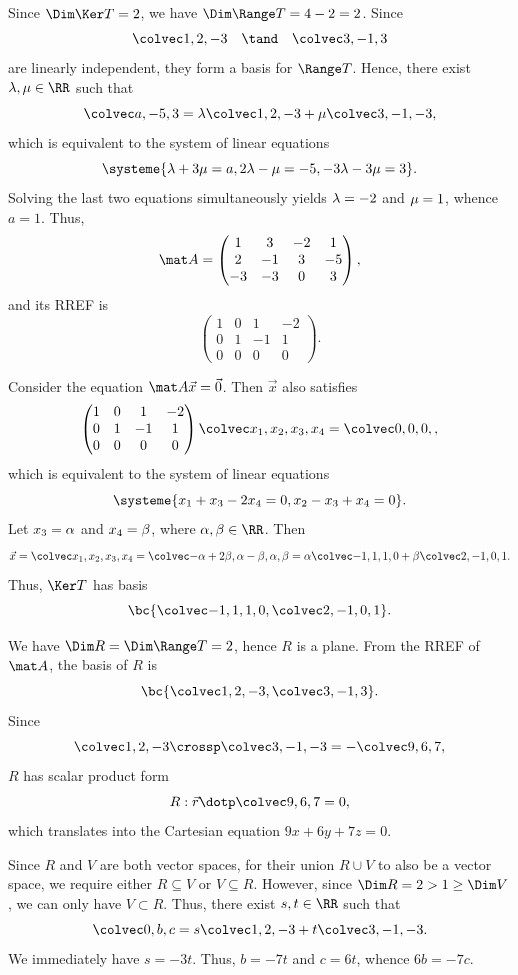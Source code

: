 \begin{solution}
    \begin{ppart}
        Since $\Dim \Ker T = 2$, we have $\Dim \Range T = 4 - 2 = 2$. Since \[\cveciii12{-3} \quad \tand \quad \cveciii3{-1}{3}\] are linearly independent, they form a basis for $\Range T$. Hence, there exist $\l, \m \in \RR$ such that \[\cveciii{a}{-5}{3} = \l \cveciii12{-3} + \m \cveciii3{-1}{-3},\] which is equivalent to the system of linear equations \[\systeme{\l + 3\m = a, 2\l - \m = -5, -3\l - 3\m = 3}.\] Solving the last two equations simultaneously yields $\lambda = -2$ and $\mu = 1$, whence $a = 1$. Thus, \[\mat A = \begin{pmatrix}1 & 3 & -2 & 1 \\ 2 & -1 & 3 & -5 \\ -3 & -3 & 0 & 3\end{pmatrix},\] and its RREF is \[\begin{pmatrix}1 & 0 & 1 & -2 \\ 0 & 1 & -1 & 1 \\ 0 & 0 & 0 & 0\end{pmatrix}.\]

        Consider the equation $\mat A \vec x = \vec 0$. Then $\vec x$ also satisfies \[\begin{pmatrix}1 & 0 & 1 & -2 \\ 0 & 1 & -1 & 1 \\ 0 & 0 & 0 & 0\end{pmatrix} \cveciv{x_1}{x_2}{x_3}{x_4} = \cveciv000,\] which is equivalent to the system of linear equations \[\systeme{x_1 + x_3 - 2x_4 = 0, x_2 - x_3 + x_4 = 0}.\] Let $x_3 = \alpha$ and $x_4 = \beta$, where $\a, \b \in \RR$. Then \[\vec x = \cveciv{x_1}{x_2}{x_3}{x_4} = \cveciv{-\a + 2\b}{\a - \b}{\a}{\b} = \a \cveciv{-1}110 + \b \cveciv2{-1}01.\] Thus, $\Ker T$ has basis \[\bc{\cveciv{-1}110, \cveciv2{-1}01}.\]
    \end{ppart}
    \begin{ppart}
        We have $\Dim R = \Dim \Range T = 2$, hence $R$ is a plane. From the RREF of $\mat A$, the basis of $R$ is \[\bc{\cveciii12{-3}, \cveciii3{-1}3}.\] Since \[\cveciii12{-3} \crossp \cveciii3{-1}{-3} = -\cveciii967,\] $R$ has scalar product form \[R : \vec r \dotp \cveciii967 = 0,\] which translates into the Cartesian equation $9x + 6y + 7z = 0$.
    \end{ppart}
    \begin{ppart}
        Since $R$ and $V$ are both vector spaces, for their union $R \cup V$ to also be a vector space, we require either $R \subseteq V$ or $V \subseteq R$. However, since $\Dim R = 2 > 1 \geq \Dim V$, we can only have $V \subset R$. Thus, there exist $s, t \in \RR$ such that \[\cveciii0bc = s \cveciii12{-3} + t\cveciii3{-1}{-3}.\] We immediately have $s = -3t$. Thus, $b = -7t$ and $c = 6t$, whence $6b = -7c$.
    \end{ppart}
\end{solution}

